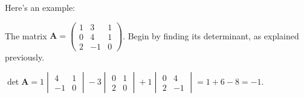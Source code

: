 \documentclass[../main.tex]{subfile}
\begin{document}
Here's an example:


The matrix $\displaystyle \mathbf{A} = \begin{pmatrix}1 & 3 & 1\\ 0 & 4 & 1\\ 2 & -1 & 0\end{pmatrix}$. Begin by finding its determinant, as explained previously.

$\det\mathbf{A} = 1 \begin{vmatrix}4 & 1\\ -1 & 0\end{vmatrix} - 3 \begin{vmatrix}0 & 1\\ 2 & 0\end{vmatrix} + 1 \begin{vmatrix}0 & 4\\ 2 & -1\end{vmatrix} = 1 + 6 - 8 = -1$.

\end{document}

